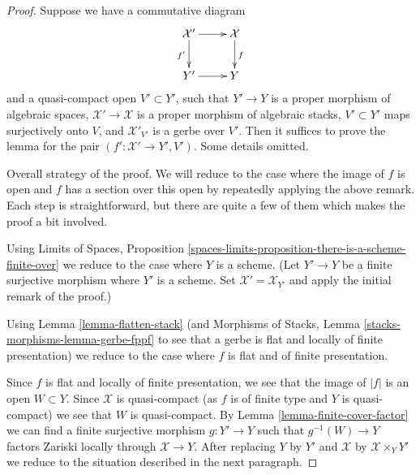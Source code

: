 \documentclass[10pt,a4paper]{amsart}
\theoremstyle{plain}
\theoremstyle{definition}
\theoremstyle{remark}
\numberwithin{equation}{subsection}
\begin{document}
\begin{proof}
Suppose we have a commutative diagram
$$
\xymatrix{
\mathcal{X}' \ar[d]_{f'} \ar[r] & \mathcal{X} \ar[d]^f \\
Y' \ar[r] & Y
}
$$
and a quasi-compact open $V' \subset Y'$, such that
$Y' \to Y$ is a proper morphism of algebraic spaces,
$\mathcal{X}' \to \mathcal{X}$ is a proper morphism of algebraic stacks,
$V' \subset Y'$ maps surjectively onto $V$, and
$\mathcal{X}'_{V'}$ is a gerbe over $V'$.
Then it suffices to prove the lemma for the pair
$(f' : \mathcal{X}' \to Y', V')$. Some details omitted.

\medskip\noindent
Overall strategy of the proof. We will reduce
to the case where the image of $f$ is open and $f$
has a section over this open by repeatedly applying the
above remark. Each step is straightforward, but there are
quite a few of them which makes the proof a bit involved.

\medskip\noindent
Using Limits of Spaces, Proposition
\ref{spaces-limits-proposition-there-is-a-scheme-finite-over}
we reduce to the case where $Y$ is a scheme.
(Let $Y' \to Y$ be a finite surjective morphism where $Y'$ is
a scheme. Set $\mathcal{X}' = \mathcal{X}_{Y'}$ and apply
the initial remark of the proof.)

\medskip\noindent
Using Lemma \ref{lemma-flatten-stack}
(and Morphisms of Stacks, Lemma \ref{stacks-morphisms-lemma-gerbe-fppf}
to see that a gerbe is flat and locally of finite presentation)
we reduce to the case where $f$ is flat and of finite presentation.

\medskip\noindent
Since $f$ is flat and locally of finite
presentation, we see that the image of $|f|$ is an open $W \subset Y$.
Since $\mathcal{X}$ is quasi-compact (as $f$ is of finite type
and $Y$ is quasi-compact) we see that $W$ is quasi-compact.
By Lemma \ref{lemma-finite-cover-factor}
we can find a finite surjective morphism $g : Y' \to Y$
such that $g^{-1}(W) \to Y$ factors Zariski locally
through $\mathcal{X} \to Y$.
After replacing $Y$ by $Y'$ and $\mathcal{X}$ by
$\mathcal{X} \times_Y Y'$ we reduce to the situation
described in the next paragraph.


\end{proof}
\end{document}
